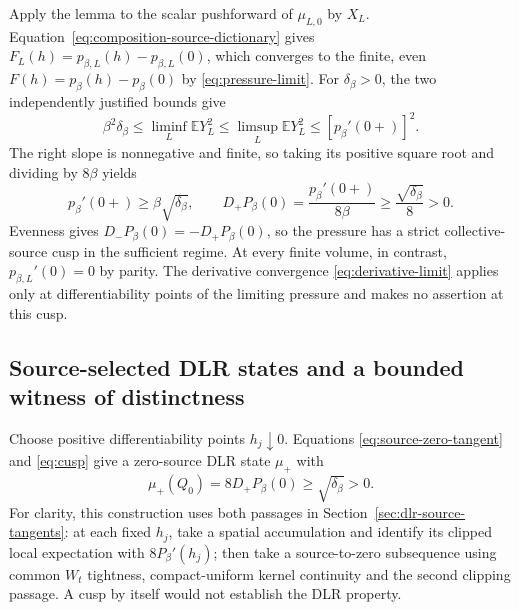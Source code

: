 \documentclass[11pt]{article}
\numberwithin{equation}{section}
\theoremstyle{definition}
\newcommand{\E}{\mathbb E}
\begin{document}
Apply the lemma to the scalar pushforward of $\mu_{L,0}$ by $X_L$.
Equation~\eqref{eq:composition-source-dictionary} gives
$F_L(h)=p_{\beta,L}(h)-p_{\beta,L}(0)$, which converges to the finite,
even $F(h)=p_\beta(h)-p_\beta(0)$ by \eqref{eq:pressure-limit}.
For $\delta_\beta>0$, the two independently justified bounds give
\begin{equation}
 \beta^2\delta_\beta
 \leq\liminf_L\E Y_L^2
 \leq\limsup_L\E Y_L^2
 \leq[p_\beta'(0+)]^2.
 \label{eq:composition-liminf-limsup}
\end{equation}
The right slope is nonnegative and finite, so taking its positive square
root and dividing by $8\beta$ yields
\begin{equation}
 p_\beta'(0+)\geq\beta\sqrt{\delta_\beta},\qquad
 D_+P_\beta(0)=\frac{p_\beta'(0+)}{8\beta}
 \geq\frac{\sqrt{\delta_\beta}}8>0. \label{eq:cusp}
\end{equation}
Evenness gives $D_-P_\beta(0)=-D_+P_\beta(0)$, so the pressure has a strict
collective-source cusp in the sufficient regime.
At every finite volume, in contrast,
$p_{\beta,L}'(0)=0$ by parity.  The derivative convergence
\eqref{eq:derivative-limit} applies only at differentiability points of
the limiting pressure and makes no assertion at this cusp.

\subsection{Source-selected DLR states and a bounded witness of distinctness}

Choose positive differentiability points $h_j\downarrow0$.  Equations
\eqref{eq:source-zero-tangent} and \eqref{eq:cusp} give a zero-source DLR
state $\mu_+$ with
\begin{equation}
 \mu_+(Q_0)=8D_+P_\beta(0)\geq\sqrt{\delta_\beta}>0. \label{eq:mu-plus}
\end{equation}
For clarity, this construction uses both passages in
Section~\ref{sec:dlr-source-tangents}: at each fixed $h_j$, take a spatial
accumulation and identify its clipped local expectation with
$8P_\beta'(h_j)$; then take a source-to-zero subsequence using common
$W_t$ tightness, compact-uniform kernel continuity and the second clipping
passage.  A cusp by itself would not establish the DLR property.
\end{document}
